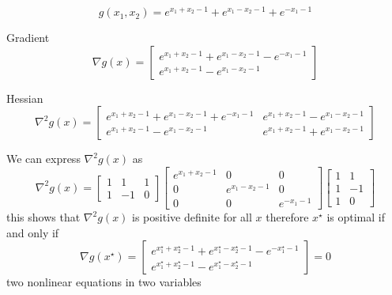 \begin{example}
    \begin{equation} g\left(x_{1}, x_{2}\right)=e^{x_{1}+x_{2}-1}+e^{x_{1}-x_{2}-1}+e^{-x_{1}-1} \end{equation}

    Gradient
\begin{equation}
\nabla g(x)=\left[\begin{array}{c}
e^{x_{1}+x_{2}-1}+e^{x_{1}-x_{2}-1}-e^{-x_{1}-1} \\
e^{x_{1}+x_{2}-1}-e^{x_{1}-x_{2}-1}
\end{array}\right]
\end{equation}

Hessian
\begin{equation}
\nabla^{2} g(x)=\left[\begin{array}{cc}
e^{x_{1}+x_{2}-1}+e^{x_{1}-x_{2}-1}+e^{-x_{1}-1} & e^{x_{1}+x_{2}-1}-e^{x_{1}-x_{2}-1} \\
e^{x_{1}+x_{2}-1}-e^{x_{1}-x_{2}-1} & e^{x_{1}+x_{2}-1}+e^{x_{1}-x_{2}-1}
\end{array}\right]
\end{equation}


    We can express $ \nabla^{2} g(x) $ as
\begin{equation}
\nabla^{2} g(x)=\left[\begin{array}{rrr}
1 & 1 & 1 \\
1 & -1 & 0
\end{array}\right]\left[\begin{array}{ccc}
e^{x_{1}+x_{2}-1} & 0 & 0 \\
0 & e^{x_{1}-x_{2}-1} & 0 \\
0 & 0 & e^{-x_{1}-1}
\end{array}\right]\left[\begin{array}{rr}
1 & 1 \\
1 & -1 \\
1 & 0
\end{array}\right]
\end{equation}
this shows that $ \nabla^{2} g(x) $ is positive definite for all $ x $
therefore $ x^{\star} $ is optimal if and only if
\begin{equation}
\nabla g\left(x^{\star}\right)=\left[\begin{array}{c}
e^{x_{1}^{\star}+x_{2}^{\star}-1}+e^{x_{1}^{\star}-x_{2}^{\star}-1}-e^{-x_{1}^{\star}-1} \\
e^{x_{1}^{\star}+x_{2}^{\star}-1}-e^{x_{1}^{\star}-x_{2}^{\star}-1}
\end{array}\right]=0
\end{equation}
two nonlinear equations in two variables
\end{example}


